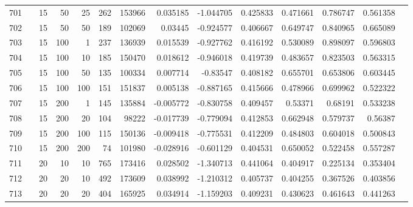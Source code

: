 \begin{longtable}{llrrrrrrrrrrrr}
		701 & &           15 &                50 &           25 &         262 &     153966 &  0.035185 & -1.044705 &  0.425833 &    0.471661 &       0.786747 &  0.561358 \\
		702 & &           15 &                50 &           50 &         189 &     102069 &   0.03445 & -0.924577 &  0.406667 &    0.649747 &       0.840965 &  0.665089 \\
		703 & &           15 &               100 &            1 &         237 &     136939 &  0.015539 & -0.927762 &  0.416192 &    0.530089 &       0.898097 &  0.596803 \\
		704 & &           15 &               100 &           10 &         185 &     150470 &  0.018612 & -0.946018 &  0.419739 &    0.483657 &       0.823503 &  0.563315 \\
		705 & &           15 &               100 &           50 &         135 &     100334 &  0.007714 &  -0.83547 &  0.408182 &    0.655701 &       0.653806 &  0.603445 \\
		706 & &           15 &               100 &          100 &         151 &     151837 &  0.005138 & -0.887165 &  0.415666 &    0.478966 &       0.699962 &  0.522322 \\
		707 & &           15 &               200 &            1 &         145 &     135884 & -0.005772 & -0.830758 &  0.409457 &     0.53371 &        0.68191 &  0.533238 \\
		708 & &           15 &               200 &           20 &         104 &      98222 & -0.017739 & -0.779094 &  0.412853 &    0.662948 &       0.579737 &   0.56387 \\
		709 & &           15 &               200 &          100 &         115 &     150136 & -0.009418 & -0.775531 &  0.412209 &    0.484803 &       0.604018 &  0.500843 \\
		710 & &           15 &               200 &          200 &          74 &     101980 & -0.028916 & -0.601129 &  0.404531 &    0.650052 &       0.522458 &  0.557287 \\
		711 & &           20 &                10 &           10 &         765 &     173416 &  0.028502 & -1.340713 &  0.441064 &    0.404917 &       0.225134 &  0.353404 \\
		712 & &           20 &                20 &           10 &         492 &     173609 &  0.038992 & -1.210312 &  0.405737 &    0.404255 &       0.367526 &  0.403856 \\
		713 & &           20 &                20 &           20 &         404 &     165925 &  0.034914 & -1.159203 &  0.409231 &    0.430623 &       0.461643 &  0.441263 \\

\end{longtable}
